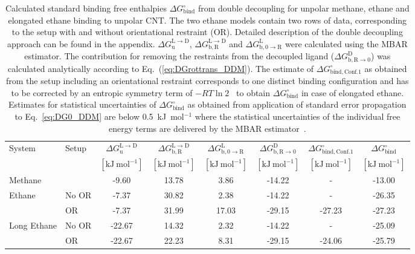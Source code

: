 \documentclass[9pt,lessons,pubversion]{livecoms}
\begin{document}
\begin{table}[htb!]
\caption{\label{tbl:DDM} 
Calculated standard binding free enthalpies $\Delta G^\circ_\mathrm{bind}$ from  double decoupling for unpolar methane, ethane and elongated ethane binding to unpolar CNT.
The two ethane models contain two rows of data, corresponding to the setup with and without orientational restraint (OR).
Detailed description of the double decoupling approach can be found in the appendix.
$\Delta G^\mathrm{L \rightarrow D}_\mathrm{u}$, $\Delta G^\mathrm{L \rightarrow D}_\mathrm{b, R}$ and $\Delta G^\mathrm{L}_\mathrm{b, 0 \rightarrow R}$ were calculated using the MBAR estimator.
The contribution for removing the restraints from the decoupled ligand ($\Delta G^\mathrm{D}_\mathrm{b, R \rightarrow 0}$) was calculated analytically according to Eq.~(\ref{eq:DGrottrans_DDM}).
The estimate of $\Delta G^\circ_\mathrm{bind, Conf. 1}$ as obtained from the setup including an orientational restraint corresponds to one distinct binding configuration and has to be corrected 
by an entropic symmetry term of $-RT \ln 2$~\cite{gilson2013correction, hermans1997inclusion} to obtain $\Delta G^\circ_\mathrm{bind}$ in case of elongated ethane.
Estimates for statistical uncertainties of $\Delta G^\circ_\mathrm{bind}$ as obtained from application of standard error propagation to Eq.~\ref{eq:DG0_DDM} are below 0.5~kJ~mol$^{-1}$ where 
the statistical uncertainties of the individual free energy terms are delivered by the MBAR estimator~\cite{shirts2008statistically}.
}
\centering
\begin{tabular}{llc ccc cc}\hline
System & Setup & $\Delta G^\mathrm{L \rightarrow D}_\mathrm{u}$ & $\Delta G^\mathrm{L \rightarrow D}_\mathrm{b, R}$ & $\Delta G^\mathrm{L}_\mathrm{b, 0 \rightarrow R}$ & 
$\Delta G^\mathrm{D}_\mathrm{b, R \rightarrow 0}$ & $\Delta G^\circ_\mathrm{bind, Conf. 1}$ & $\Delta G^\circ_\mathrm{bind}$ \\
& & $[\mathrm{kJ~mol}^{-1}]$ & $[\mathrm{kJ~mol}^{-1}]$ & $[\mathrm{kJ~mol}^{-1}]$ & $[\mathrm{kJ~mol}^{-1}]$ & $[\mathrm{kJ~mol}^{-1}]$ & $[\mathrm{kJ~mol}^{-1}]$ \\ 
\hline
Methane 						& & -9.60	& 13.78	& 3.86 & -14.22 & - & -13.00 \\
\hline
\multirow{ 2}{*}{Ethane}  	& No OR & -7.37 & 30.82 & 2.38 & -14.22 & - & -26.35 \\
					& OR       & -7.37 & 31.99 & 17.03 & -29.15 & -27.23 & -27.23 \\
\hline
\multirow{ 2}{*}{Long Ethane}  & No OR & -22.67 & 14.32 & 2.32 & -14.22 & - & -25.09\\  
					      & OR       & -22.67 & 22.23 & 8.31 & -29.15 & -24.06 & -25.79\\
\hline
\end{tabular}
\end{table}
\end{document}
